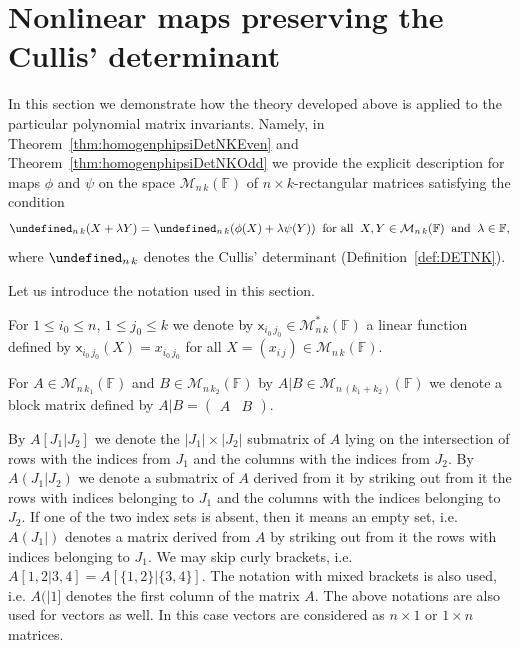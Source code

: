 \documentclass{elsarticle}
\let\det\undefined
\DeclareMathOperator{\det}{det}
\def\F{{\mathbb F}}
\def\M{{\mathcal M}}
\theoremstyle{definition}
\newtheorem{definition}[theorem]{Definition}
\numberwithin{equation}{section}
\begin{document}
\section{Nonlinear maps preserving the Cullis' determinant}
\label{sec:AppToCullisDet}

In this section we demonstrate how the theory developed above is applied to the particular polynomial matrix invariants. Namely, in Theorem~\ref{thm:homogenphipsiDetNKEven} and Theorem~\ref{thm:homogenphipsiDetNKOdd} we provide the explicit description for maps $\phi$ and $\psi$ on the space $\M_{n\,k}(\F)$ of $n\times k$-rectangular matrices satisfying the condition
\begin{equation}\label{cond:DETNK}
\det_{n\,k}(X + \lambda Y) = \det_{n\,k}(\phi(X) + \lambda \psi(Y))\;\;\mbox{for all}\;\;X, Y \in \M_{n\,k}(\F)\;\;\mbox{and}\;\;\lambda \in \F,
\end{equation}
where $\det_{n\,k}$ denotes the Cullis' determinant (Definition~\ref{def:DETNK}). \bigskip

Let us introduce the notation used in this section. 

For  $1 \le i_0 \le n$, $1 \le j_0 \le k$  we denote by $\mathsf x_{i_0\,j_0} \in \M_{n\,k}^*(\F)$  a linear function defined by $\mathsf x_{i_0\,j_0}(X) = x_{i_0\,j_0}$ for all $X = (x_{i\,j}) \in \M_{n\,k}(\F)$.

For $A \in \M_{n\,k_1}(\F)$ and $B \in \M_{n\,k_2}(\F)$ by $A|B \in \M_{n\,(k_1+k_2)}(\F)$ we denote a block matrix defined by $A|B = \begin{pmatrix} A & B\end{pmatrix}$.

By $A[J_1|J_2]$ we denote the $|J_1| \times |J_2|$ submatrix of $A$ lying on the intersection of rows with the indices from $J_1$ and the columns with the indices from $J_2$. By $A(J_1|J_2)$ we denote a submatrix of $A$ derived from it by striking out from it the rows with indices belonging to $J_1$ and the columns with the indices belonging to $J_2$. If one of the two index sets is absent, then it means an empty set, i.e. $A(J_1|)$ denotes a matrix derived from $A$ by striking out from it the rows with indices belonging to $J_1$. We may skip curly brackets, i.e. $A[1,2|3,4] = A[\{1,2\}|\{3,4\}]$. The notation with mixed brackets is also used, i.e. $A(|1]$ denotes the first column of the matrix $A$. The above notations are also used for vectors as well. In this case vectors are considered as $n\times 1$ or $1 \times n$ matrices.
\end{document}
